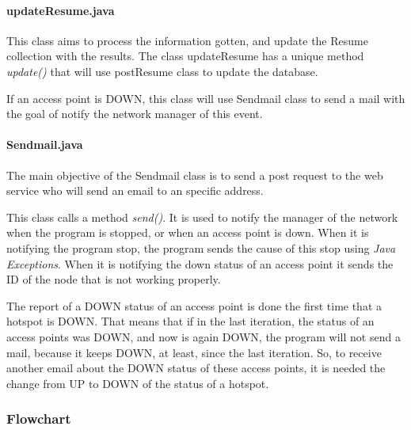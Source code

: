\documentclass[12pt, a4paper,twoside]{tesi_upf}
\begin{document}
                \paragraph{updateResume.java}
                This class aims to process the information gotten, and update the Resume collection with the results. The class updateResume has a unique method \textit{update()} that will use postResume class to update the database.
                
                If an access point is DOWN, this class will use Sendmail class to send a mail with the goal of notify the network manager of this event.\\
                
                 \paragraph{Sendmail.java}
                 The main objective of the Sendmail class is to send a post request to the web service who will send an email to an specific address.
                 
                 This class calls a method \textit{send()}. It is used to notify the manager of the network when the program is stopped, or when an access point is down.
                 When it is notifying the program stop, the program sends the cause of this stop using \textit{Java Exceptions}.
                 When it is notifying the down status of an access point it sends the ID of the node that is not working properly.

                 The report of a DOWN status of an access point is done the first time that a hotspot is DOWN. That means that if in the last iteration, the status of an access points was DOWN, and now is again DOWN, the program will not send a mail, because it keeps DOWN, at least, since the last iteration.
                So, to receive another email about the DOWN status of these access points, it is needed the change from UP to DOWN of the status of a hotspot.
                 
        
            \subsubsection{Flowchart}
            
\end{document}

